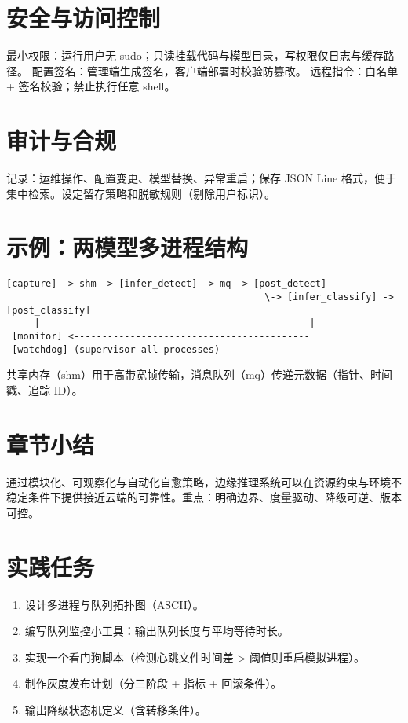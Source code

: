 \section{安全与访问控制}\label{ux5b89ux5168ux4e0eux8bbfux95eeux63a7ux5236}

最小权限：运行用户无
sudo；只读挂载代码与模型目录，写权限仅日志与缓存路径。
配置签名：管理端生成签名，客户端部署时校验防篡改。 远程指令：白名单 +
签名校验；禁止执行任意 shell。

\section{审计与合规}\label{ux5ba1ux8ba1ux4e0eux5408ux89c4}

记录：运维操作、配置变更、模型替换、异常重启；保存 JSON Line
格式，便于集中检索。设定留存策略和脱敏规则（剔除用户标识）。

\section{示例：两模型多进程结构}\label{ux793aux4f8bux4e24ux6a21ux578bux591aux8fdbux7a0bux7ed3ux6784}

\begin{lstlisting}
[capture] -> shm -> [infer_detect] -> mq -> [post_detect]
                                              \-> [infer_classify] -> [post_classify]
     |                                                |
 [monitor] <------------------------------------------
 [watchdog] (supervisor all processes)
\end{lstlisting}

共享内存（shm）用于高带宽帧传输，消息队列（mq）传递元数据（指针、时间戳、追踪
ID）。

\section{章节小结}\label{ux7ae0ux8282ux5c0fux7ed3}

通过模块化、可观察化与自动化自愈策略，边缘推理系统可以在资源约束与环境不稳定条件下提供接近云端的可靠性。重点：明确边界、度量驱动、降级可逆、版本可控。

\section{实践任务}\label{ux5b9eux8df5ux4efbux52a1}

\begin{enumerate}
\def\labelenumi{\arabic{enumi}.}
\tightlist
\item
  设计多进程与队列拓扑图（ASCII）。
\item
  编写队列监控小工具：输出队列长度与平均等待时长。
\item
  实现一个看门狗脚本（检测心跳文件时间差 \textgreater{}
  阈值则重启模拟进程）。
\item
  制作灰度发布计划（分三阶段 + 指标 + 回滚条件）。
\item
  输出降级状态机定义（含转移条件）。
\end{enumerate}
